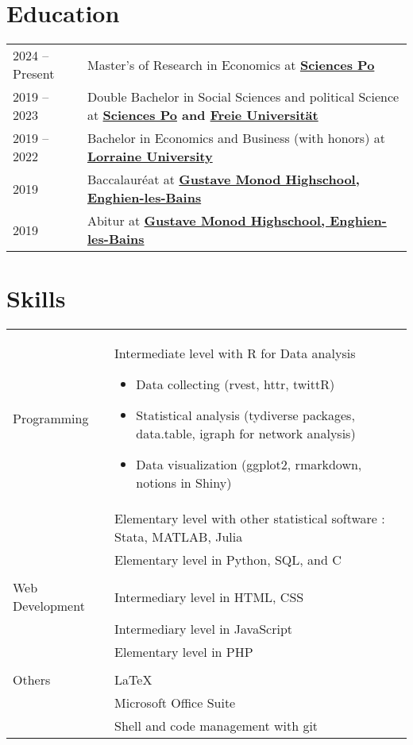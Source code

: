 \documentclass[a4paper,12pt]{article}
\begin{document}
\section{Education}
\begin{tabularx}{\linewidth}{@{}l X@{}}	

2024 – Present & Master’s of Research in Economics at \textbf{\hyperlink{https://www.sciencespo.fr/en/}{Sciences Po}} \\ 

2019 – 2023 & Double Bachelor in Social Sciences and political Science at \textbf{\hyperlink{https://www.sciencespo.fr/fr/}{Sciences Po} and \hyperlink{https://www.fu-berlin.de/en/index.html}{Freie Universität}}\\

2019 – 2022 & Bachelor in Economics and Business (with honors) at \textbf{\hyperlink{https://www.univ-lorraine.fr/en}{Lorraine University}}\\

2019 & Baccalauréat at \textbf{\hyperlink{https://www.lyc-polyvalent-monod-enghien.fr/}{Gustave Monod Highschool, Enghien-les-Bains}} \hfill \\

2019 & Abitur at \textbf{\hyperlink{https://www.lyc-polyvalent-monod-enghien.fr/}{Gustave Monod Highschool, Enghien-les-Bains}} \hfill \\

\end{tabularx}

\section{Skills}
\begin{tabularx}{\linewidth}{@{}l X@{}}
Programming & Intermediate level with R for Data analysis
\begin{itemize}
    \item Data collecting (rvest, httr, twittR)
    \item Statistical analysis (tydiverse packages, data.table, igraph for network analysis)
    \item Data visualization (ggplot2, rmarkdown, notions in Shiny)
\end{itemize} \\ 
& Elementary level with other statistical software : Stata, MATLAB, Julia \\
& Elementary level in Python, SQL, and C \\
& \\
Web Development  &  Intermediary level in HTML, CSS \\
& Intermediary level in JavaScript \\
& Elementary level in PHP\\
& \\
Others & \LaTeX \\
& Microsoft Office Suite \\
& Shell and code management with git \\
\end{tabularx}
\end{document}
